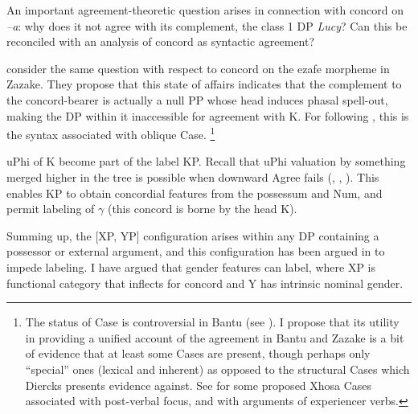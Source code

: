 \documentclass[output=paper
,modfonts
,nonflat]{langsci/langscibook}
\begin{document}
\newpage \noindent An important agreement-theoretic question arises in connection with concord on \textit{–a}: why does it not agree with its complement, the class 1 DP \textit{Lucy}? Can this be reconciled with an analysis of concord as syntactic agreement?

\citet{Toosarvandani_Van_Urk2014} consider the same question with respect to concord on the ezafe morpheme in Zazake. They propose that this state of affairs indicates that the complement to the concord-bearer is actually a null PP whose head induces phasal spell-out, making the DP within it inaccessible for agreement with K. For \citet{Toosarvandani_Van_Urk2014} following \citet{Rezac2008}, this is the syntax associated with oblique Case. \footnote{The status of Case is controversial in Bantu (see \citealt{Diercks2012}). I propose that its utility in providing a unified account of the agreement in Bantu and Zazake is a bit of evidence that at least some Cases are present, though perhaps only “special” ones (lexical and inherent) as opposed to the structural Cases which Diercks presents evidence against. See \citet{Carstens_Mletshe2015} for some proposed Xhosa Cases associated with post-verbal focus, and with arguments of experiencer verbs.}
\begin{figure}[!h]
	\begin{exe}
	\end{exe}
\end{figure}
\newline \noindent uPhi of K become part of the label KP. Recall that uPhi valuation by something merged higher in the tree is possible when downward Agree fails (\citealt{Bejar_Rezac2009}, \citealt{Carstens2016},  \citealt{Toosarvandani_Van_Urk2014}). This enables KP to obtain concordial features from the possessum and Num, and permit labeling of $\gamma$ (this concord is borne by the head K).

Summing up, the [XP, YP] configuration arises within any DP containing a possessor or external argument, and this configuration has been argued in \citet{Chomsky2013, Chomsky2015} to impede labeling. I have argued that gender features can label, where XP is functional category that inflects for concord and Y has intrinsic nominal gender. 
\end{document}
